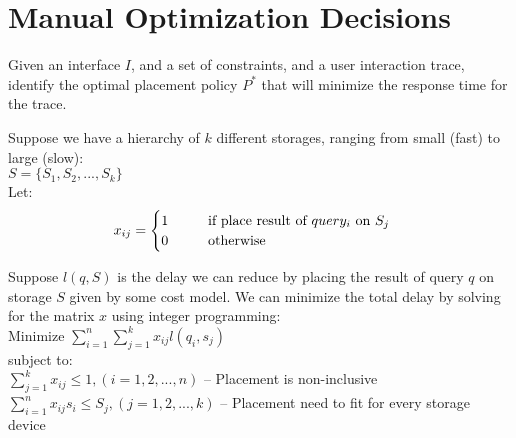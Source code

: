 


\section*{Manual Optimization Decisions}

\begin{problem}
  Given an interface $I$, and a set of constraints, and a user interaction trace, identify the optimal placement policy $P^*$ that will minimize the response time for the trace.
\end{problem}

Suppose we have a hierarchy of $k$ different storages, ranging from small (fast) to large (slow):\\

\hspace{10mm} $S=\{S_1, S_2, ..., S_k\}$\\

Let:
\begin{equation}
	x_{ij}=
	\begin{cases}
		1 \hspace{10mm} \text{if place result of $query_i$ on $S_j$} \\
		0 \hspace{10mm} \text{otherwise}
	\end{cases}
\end{equation}

Suppose $l(q, S)$ is the delay we can reduce by placing the result of query $q$ on storage $S$ given by some cost model. We can minimize the total delay by solving for the matrix $x$ using integer programming:\\

\hspace{10mm} Minimize $\sum_{i=1}^{n} \sum_{j=1}^{k} x_{ij} l(q_i, s_j)$\\

subject to:\\

\hspace{10mm} $\sum_{j=1}^{k} x_{ij} \le 1, (i=1,2,...,n)$ \hspace{10mm} -- Placement is non-inclusive\\

\hspace{10mm} $\sum_{i=1}^{n} x_{ij} s_i \le S_j, (j=1,2,...,k)$ \hspace{10mm} -- Placement need to fit for every storage device\\
  
